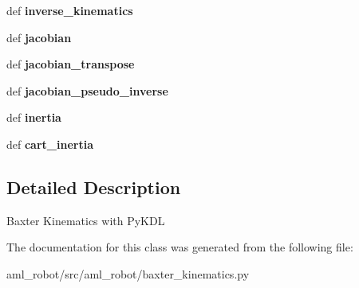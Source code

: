 \begin{DoxyCompactItemize}
\item 
\hypertarget{classaml__robot_1_1baxter__kinematics_1_1baxter__kinematics_a5eaca30766683990b213182527cb3813}{def {\bfseries inverse\-\_\-kinematics}}\label{classaml__robot_1_1baxter__kinematics_1_1baxter__kinematics_a5eaca30766683990b213182527cb3813}

\item 
\hypertarget{classaml__robot_1_1baxter__kinematics_1_1baxter__kinematics_a307997661ec9ef26ae4a74bda67a3352}{def {\bfseries jacobian}}\label{classaml__robot_1_1baxter__kinematics_1_1baxter__kinematics_a307997661ec9ef26ae4a74bda67a3352}

\item 
\hypertarget{classaml__robot_1_1baxter__kinematics_1_1baxter__kinematics_a421d5a7383a8b88e7b03efc469f30098}{def {\bfseries jacobian\-\_\-transpose}}\label{classaml__robot_1_1baxter__kinematics_1_1baxter__kinematics_a421d5a7383a8b88e7b03efc469f30098}

\item 
\hypertarget{classaml__robot_1_1baxter__kinematics_1_1baxter__kinematics_ad70f0257064b8a85ee6537e2187822d8}{def {\bfseries jacobian\-\_\-pseudo\-\_\-inverse}}\label{classaml__robot_1_1baxter__kinematics_1_1baxter__kinematics_ad70f0257064b8a85ee6537e2187822d8}

\item 
\hypertarget{classaml__robot_1_1baxter__kinematics_1_1baxter__kinematics_a7fd0653ad6b2012a933822f98901ccce}{def {\bfseries inertia}}\label{classaml__robot_1_1baxter__kinematics_1_1baxter__kinematics_a7fd0653ad6b2012a933822f98901ccce}

\item 
\hypertarget{classaml__robot_1_1baxter__kinematics_1_1baxter__kinematics_af243bf47f45355fb5e71a23ed8b21d28}{def {\bfseries cart\-\_\-inertia}}\label{classaml__robot_1_1baxter__kinematics_1_1baxter__kinematics_af243bf47f45355fb5e71a23ed8b21d28}

\end{DoxyCompactItemize}


\subsection{Detailed Description}
\begin{DoxyVerb}Baxter Kinematics with PyKDL
\end{DoxyVerb}
 

The documentation for this class was generated from the following file\-:\begin{DoxyCompactItemize}
\item 
aml\-\_\-robot/src/aml\-\_\-robot/baxter\-\_\-kinematics.\-py\end{DoxyCompactItemize}
